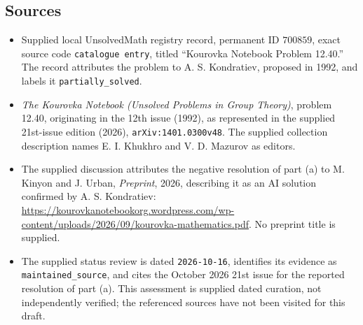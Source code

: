 \documentclass[11pt]{article}
\begin{document}
\subsection{Sources}
\begin{itemize}
\item Supplied local UnsolvedMath registry record, permanent ID \(700859\), exact source code \texttt{catalogue entry}, titled ``Kourovka Notebook Problem 12.40.'' The record attributes the problem to A. S. Kondratiev, proposed in 1992, and labels it \texttt{partially\_solved}.
\item \emph{The Kourovka Notebook (Unsolved Problems in Group Theory)}, problem 12.40, originating in the 12th issue (1992), as represented in the supplied 21st-issue edition (2026), \texttt{arXiv:1401.0300v48}. The supplied collection description names E. I. Khukhro and V. D. Mazurov as editors.
\item The supplied discussion attributes the negative resolution of part (a) to M. Kinyon and J. Urban, \emph{Preprint}, 2026, describing it as an AI solution confirmed by A. S. Kondratiev: \url{https://kourovkanotebookorg.wordpress.com/wp-content/uploads/2026/09/kourovka-mathematics.pdf}. No preprint title is supplied.
\item The supplied status review is dated \texttt{2026-10-16}, identifies its evidence as \texttt{maintained\_source}, and cites the October 2026 21st issue for the reported resolution of part (a). This assessment is supplied dated curation, not independently verified; the referenced sources have not been visited for this draft.
\end{itemize}
\end{document}

